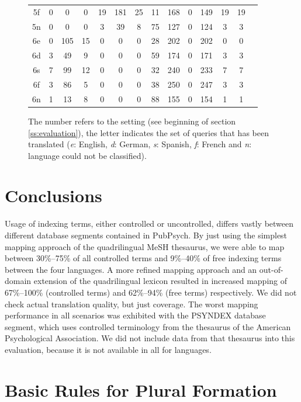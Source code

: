 \documentclass[a4paper,11pt]{article}
\begin{document}
\begin{figure}[h]
\begin{tabular}{c|c|c|c|c|c|c|c|c|c|c|c|c|c}
			5f & 0 & 0 & 0 & 19 & 181 & 25 & 11 & 168 & 0 & 149 & 19 & 19 \\
			5n & 0 & 0 & 0 & 3 & 39 & 8 & 75 & 127 & 0 & 124 & 3 & 3  \\
			6e & 0 & 105 & 15 & 0 & 0 & 0 & 28 & 202 & 0 & 202 & 0 & 0 \\
			6d & 3 & 49 & 9 & 0 & 0 & 0 & 59 & 174 & 0 & 171 & 3 & 3  \\
			6s & 7 & 99 & 12 & 0 & 0 & 0 & 32 & 240 & 0 & 233 & 7 & 7  \\
			6f & 3 & 86 & 5 & 0 & 0 & 0 & 38 & 250 & 0 & 247 & 3 & 3 \\
			6n & 1 & 13 & 8 & 0 & 0 & 0 & 88 & 155 & 0 & 154 & 1 & 1 \\
		\end{tabular}
		\caption{The number refers to the setting (see beginning of section \ref{ss:evaluation}), the letter indicates the set of queries that has been translated (\textit{e}: English, \textit{d}: German, \textit{s}: Spanish, \textit{f}: French and \textit{n}: language could not be classified).}
		\label{fig:eval}
	\end{figure}
	
	\section{Conclusions}
	\label{s:conclusions}
	
	Usage of indexing terms, either controlled or uncontrolled, differs vastly between different database segments contained in PubPsych. By just using the simplest mapping approach of the quadrilingual MeSH thesaurus, we were able to map between 30\%--75\% of all controlled terms and 9\%--40\% of free indexing terms between the four languages. A more refined mapping approach and an out-of-domain extension of the quadrilingual lexicon resulted in increased mapping of 67\%--100\% (controlled terms) and 62\%--94\% (free terms) respectively. We did not check actual translation quality, but just coverage. The worst mapping performance in all scenarios was exhibited with the PSYNDEX database segment, which uses controlled terminology from the thesaurus of the American Psychological Association. We did not include data from that thesaurus into this evaluation, because it is not available in all for languages.
	
	\appendix
	\section{Basic Rules for Plural Formation}
	\label{ap:plural}
	
\end{document}
